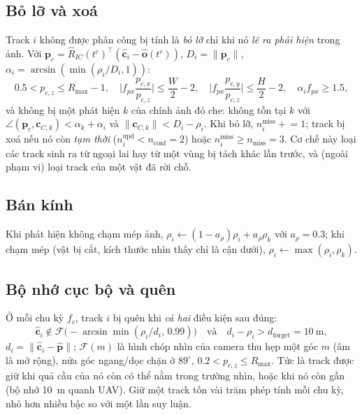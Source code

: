 \documentclass[11pt,a4paper]{article}
\numberwithin{equation}{section}
\newcommand{\vb}[1]{\bm{#1}}
\newcommand{\T}{^{\!\top}}
\theoremstyle{definition}
\theoremstyle{plain}
\theoremstyle{remark}
\begin{document}
\subsection{Bỏ lỡ và xoá}
Track $i$ không được phân công bị tính là \emph{bỏ lỡ} chỉ khi nó \emph{lẽ ra phải hiện} trong ảnh. Với $\vb p_c=\hat R_{IC}(t^c)\T(\hat{\vb c}_i-\hat{\vb o}(t^c))$, $D_i=\|\vb p_c\|$, $\alpha_i=\arcsin(\min(\rho_i/D_i,1))$:
\begin{equation}
0.5<p_{c,z}\le R_{\max}-1,\quad \Big|f_{px}\frac{p_{c,x}}{p_{c,z}}\Big|\le\frac W2-2,\quad \Big|f_{px}\frac{p_{c,y}}{p_{c,z}}\Big|\le\frac H2-2,\quad \alpha_if_{px}\ge1.5, \label{eq:expvis}
\end{equation}
và không bị một phát hiện $k$ của chính ảnh đó che: không tồn tại $k$ với $\angle(\vb p_c,\vb c_{C,k})<\alpha_k+\alpha_i$ và $\|\vb c_{C,k}\|<D_i-\rho_i$. Khi bỏ lỡ, $n_i^{\text{miss}}\mathrel{+}=1$; track bị xoá nếu nó còn \emph{tạm thời} ($n_i^{\text{upd}}<n_{\text{conf}}=2$) hoặc $n_i^{\text{miss}}\ge n_{\text{miss}}=3$. Cơ chế này loại các track sinh ra từ ngoại lai hay từ một vùng bị tách khác lần trước, và (ngoài phạm vi) loại track của một vật đã rời chỗ.

\subsection{Bán kính}
Khi phát hiện không chạm mép ảnh, $\rho_i\leftarrow(1-a_\rho)\rho_i+a_\rho\rho_k$ với $a_\rho=0.3$; khi chạm mép (vật bị cắt, kích thước nhìn thấy chỉ là cận dưới), $\rho_i\leftarrow\max(\rho_i,\rho_k)$.

\subsection{Bộ nhớ cục bộ và quên}
\label{sec:memory}
Ở mỗi chu kỳ $f_c$, track $i$ bị quên khi \emph{cả hai} điều kiện sau đúng:
\begin{equation}
\hat{\vb c}_i\notin\mathcal F\big(-\arcsin\min(\rho_i/d_i,\,0.99)\big)\quad\text{và}\quad d_i-\rho_i>d_{\text{forget}}=10~\text{m}, \label{eq:forget}
\end{equation}
$d_i=\|\hat{\vb c}_i-\hat{\vb p}\|$; $\mathcal F(m)$ là hình chóp nhìn của camera thu hẹp một góc $m$ (âm là mở rộng), nửa góc ngang/dọc chặn ở $89^\circ$, $0.2<p_{c,z}\le R_{\max}$. Tức là track được giữ khi quả cầu của nó còn có thể nằm trong trường nhìn, hoặc khi nó còn gần (bộ nhớ 10~m quanh UAV). Giữ một track tốn vài trăm phép tính mỗi chu kỳ, nhỏ hơn nhiều bậc so với một lần suy luận.
\end{document}
